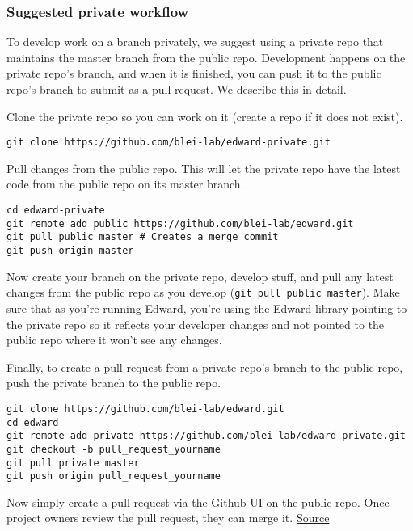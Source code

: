 \subsubsection{Suggested private
workflow}\label{suggested-private-workflow}

To develop work on a branch privately, we suggest using a private repo
that maintains the master branch from the public repo. Development
happens on the private repo's branch, and when it is finished, you can
push it to the public repo's branch to submit as a pull request. We
describe this in detail.

Clone the private repo so you can work on it (create a repo if it does
not exist).

\begin{lstlisting}[class=JSON]
git clone https://github.com/blei-lab/edward-private.git
\end{lstlisting}

Pull changes from the public repo. This will let the private repo have
the latest code from the public repo on its master branch.

\begin{lstlisting}[class=JSON]
cd edward-private
git remote add public https://github.com/blei-lab/edward.git
git pull public master # Creates a merge commit
git push origin master
\end{lstlisting}

Now create your branch on the private repo, develop stuff, and pull any
latest changes from the public repo as you develop
(\texttt{git\ pull\ public\ master}). Make sure that as you're running
Edward, you're using the Edward library pointing to the private repo so
it reflects your developer changes and not pointed to the public repo
where it won't see any changes.

Finally, to create a pull request from a private repo's branch to the
public repo, push the private branch to the public repo.

\begin{lstlisting}[class=JSON]
git clone https://github.com/blei-lab/edward.git
cd edward
git remote add private https://github.com/blei-lab/edward-private.git
git checkout -b pull_request_yourname
git pull private master
git push origin pull_request_yourname
\end{lstlisting}

Now simply create a pull request via the Github UI on the public repo.
Once project owners review the pull request, they can merge it.
\href{http://stackoverflow.com/questions/10065526/github-how-to-make-a-fork-of-public-repository-private/30352360\#30352360}{Source}
